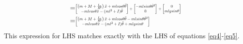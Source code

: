 \documentclass[a4paper,10pt]{article}
\newcommand\scalemath[2]{\scalebox{#1}{\mbox{\ensuremath{\displaystyle #2}}}}
\begin{document}
\begin{enumerate}[label=(\roman*)]
\begin{align}
\begin{split}
  = &\scalemath{0.6}{\left[ \begin{matrix} \left(m+M+\frac{I_w}{R^2}\right)\ddot{x} + mlcos\theta\ddot{\theta} \\ 
   -mlcos\theta\ddot{x} -(ml^2+I)\ddot{\theta} \end{matrix} \right] 
   + \left[ \begin{matrix} -mlsin\theta{\dot{\theta}}^2 \\  0 \end{matrix} \right] + \left[ \begin{matrix} 0 \\ mlgsin\theta \end{matrix} \right]} \\
  = &\scalemath{0.6}{\left[ \begin{matrix} \left(m+M+\frac{I_w}{R^2}\right)\ddot{x} + mlcos\theta\ddot{\theta} - mlsin\theta{\dot{\theta}}^2  \\ 
   -mlcos\theta\ddot{x} -(ml^2+I)\ddot{\theta} + mlgsin\theta \end{matrix} \right]}
 \end{split} \end{align}
 This expression for LHS matches exactly with the LHS of equations \ref{eq4}-\ref{eq5}.
\end{enumerate}
\end{document}
